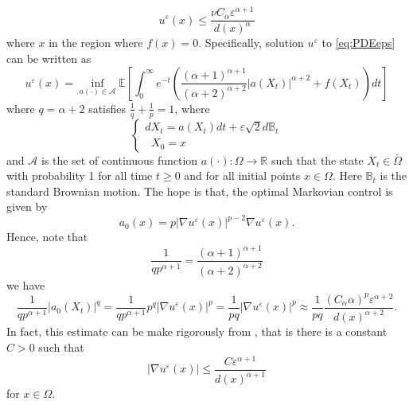 \documentclass[10pt]{article}
\theoremstyle{plain}
\theoremstyle{remark}
\begin{document}
\begin{enumerate}
\begin{equation*}
       u^\varepsilon(x) \leq \frac{\nu C_\alpha \varepsilon^{\alpha+1}}{d(x)^\alpha} 
\end{equation*}
where $x$ in the region where $f(x) = 0$. Specifically, solution $u^\varepsilon$ to \eqref{eq:PDEeps} can be written as
\begin{equation*}
    u^\varepsilon(x) = \inf_{a(\cdot)\in \mathcal{A}}  \mathbb{E}\left[\int_0^\infty e^{-t}\left(\frac{(\alpha+1)^{\alpha+1}}{(\alpha+2)^{\alpha+2}}|a(X_t)|^{\alpha+2} + f(X_t)\right)dt \right]
\end{equation*}
where $q = \alpha+2$ satisfies $\frac{1}{q} + \frac{1}{p} = 1$, where
\begin{equation*}
    \begin{cases}
    dX_t = a(X_t)dt + \varepsilon\sqrt{2} d\mathbb{B}_t\\
    \;\;X_0 = x
    \end{cases}
\end{equation*}
and $\mathcal{A}$ is the set of continuous function $a(\cdot):\Omega \to \mathbb{R}$ such that the state $X_t\in \overline{\Omega}$ with probability 1 for all time $t\geq 0$ and for all initial points $x\in \Omega$. Here $\mathbb{B}_t$ is the standard Brownian motion. The hope is that, the optimal Markovian control is given by
\begin{equation*}
    a_0(x) = p|\nabla u^\varepsilon(x)|^{p-2}\nabla u^\varepsilon(x).
\end{equation*}
Hence, note that
\begin{equation*}
    \frac{1}{qp^{\alpha+1}} = \frac{(\alpha+1)^{\alpha+1}}{(\alpha+2)^{\alpha+2}}
\end{equation*}
we have
\begin{equation*}
   \frac{1}{qp^{\alpha+1}} |a_0(X_t)|^q =  \frac{1}{qp^{\alpha+1}}p^q |\nabla u^\varepsilon(x)|^p = \frac{1}{pq}|\nabla u^\varepsilon(x)|^p \approx \frac{1}{pq}\frac{(C_\alpha \alpha)^p\varepsilon^{\alpha+2}}{d(x)^{\alpha+2}}.
\end{equation*}
In fact, this estimate can be make rigorously from \cite{alessio_asymptotic_2006}, that is there is a constant $C>0$ such that
\begin{equation*}
    |\nabla u ^\varepsilon(x)|\leq \frac{C\varepsilon^{\alpha+1}}{d(x)^{\alpha+1}}
\end{equation*}
for $x\in \Omega$.
\end{enumerate}




%
%
\end{document}
